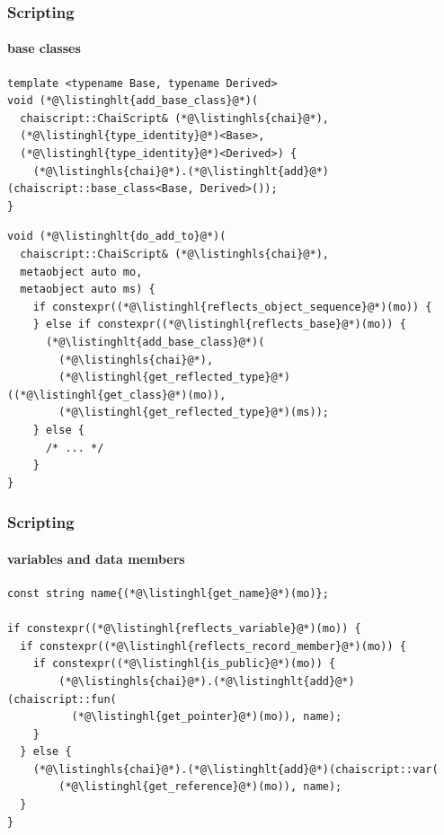 \documentclass[aspectratio=169,compress,table,xcolor=table]{beamer}
\begin{document}
\begin{frame}[fragile]
  \frametitle{Scripting}
  \framesubtitle{base classes}
  \begin{lstlisting}[language=c++2x,basicstyle=\scriptsize\ttfamily]
template <typename Base, typename Derived>
void (*@\listinghlt{add_base_class}@*)(
  chaiscript::ChaiScript& (*@\listinghls{chai}@*),
  (*@\listinghl{type_identity}@*)<Base>,
  (*@\listinghl{type_identity}@*)<Derived>) {
    (*@\listinghls{chai}@*).(*@\listinghlt{add}@*)(chaiscript::base_class<Base, Derived>());
}
  \end{lstlisting}
  \begin{lstlisting}[language=c++2x,basicstyle=\scriptsize\ttfamily]
void (*@\listinghlt{do_add_to}@*)(
  chaiscript::ChaiScript& (*@\listinghls{chai}@*),
  metaobject auto mo,
  metaobject auto ms) {
    if constexpr((*@\listinghl{reflects_object_sequence}@*)(mo)) {
    } else if constexpr((*@\listinghl{reflects_base}@*)(mo)) {
      (*@\listinghlt{add_base_class}@*)(
        (*@\listinghls{chai}@*),
        (*@\listinghl{get_reflected_type}@*)((*@\listinghl{get_class}@*)(mo)),
        (*@\listinghl{get_reflected_type}@*)(ms));
    } else {
      /* ... */
    }
}
  \end{lstlisting}
\end{frame}
\begin{frame}[fragile]
  \frametitle{Scripting}
  \framesubtitle{variables and data members}
  \begin{lstlisting}[language=c++2x,basicstyle=\small\ttfamily]
const string name{(*@\listinghl{get_name}@*)(mo)};

if constexpr((*@\listinghl{reflects_variable}@*)(mo)) {
  if constexpr((*@\listinghl{reflects_record_member}@*)(mo)) {
    if constexpr((*@\listinghl{is_public}@*)(mo)) {
        (*@\listinghls{chai}@*).(*@\listinghlt{add}@*)(chaiscript::fun(
          (*@\listinghl{get_pointer}@*)(mo)), name);
    }
  } else {
    (*@\listinghls{chai}@*).(*@\listinghlt{add}@*)(chaiscript::var(
        (*@\listinghl{get_reference}@*)(mo)), name);
  }
}
  \end{lstlisting}
\end{frame}
\end{document}

